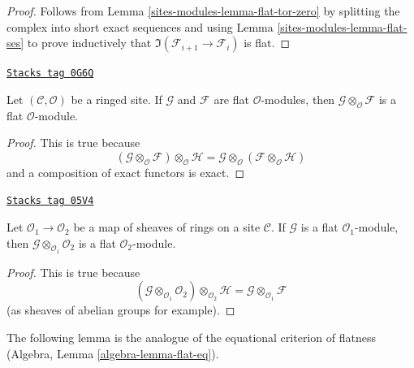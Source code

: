 \begin{proof}
Follows from Lemma \ref{sites-modules-lemma-flat-tor-zero} by splitting the complex
into short exact sequences and using Lemma \ref{sites-modules-lemma-flat-ses} to
prove inductively that $\Im(\mathcal{F}_{i + 1} \to \mathcal{F}_i)$
is flat.
\end{proof}

\begin{lemma}
\label{sites-modules-lemma-tensor-flats}
\href{https://stacks.math.columbia.edu/tag/0G6Q}{\texttt{Stacks tag 0G6Q}}

Let $(\mathcal{C}, \mathcal{O})$ be a ringed site. If $\mathcal{G}$ and
$\mathcal{F}$ are flat $\mathcal{O}$-modules, then
$\mathcal{G} \otimes_\mathcal{O} \mathcal{F}$ is a flat $\mathcal{O}$-module.
\end{lemma}

\begin{proof}
This is true because
$$
(\mathcal{G} \otimes_\mathcal{O} \mathcal{F}) \otimes_\mathcal{O} \mathcal{H}
=
\mathcal{G} \otimes_\mathcal{O} (\mathcal{F} \otimes_\mathcal{O} \mathcal{H})
$$
and a composition of exact functors is exact.
\end{proof}

\begin{lemma}
\label{sites-modules-lemma-flat-change-of-rings}
\href{https://stacks.math.columbia.edu/tag/05V4}{\texttt{Stacks tag 05V4}}

Let $\mathcal{O}_1 \to \mathcal{O}_2$ be a map of sheaves
of rings on a site $\mathcal{C}$. If $\mathcal{G}$ is a
flat $\mathcal{O}_1$-module, then
$\mathcal{G} \otimes_{\mathcal{O}_1} \mathcal{O}_2$
is a flat $\mathcal{O}_2$-module.
\end{lemma}

\begin{proof}
This is true because
$$
(\mathcal{G} \otimes_{\mathcal{O}_1} \mathcal{O}_2)
\otimes_{\mathcal{O}_2} \mathcal{H}
=
\mathcal{G} \otimes_{\mathcal{O}_1} \mathcal{F}
$$
(as sheaves of abelian groups for example).
\end{proof}

The following lemma is the analogue of the equational criterion of
flatness (Algebra, Lemma \ref{algebra-lemma-flat-eq}).

